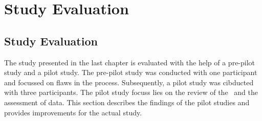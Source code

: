 \chapter{Study Evaluation}
\label{chapter:study_evaluation}
\section{Study Evaluation}
\label{sec:study_evaluation}
The study presented in the last chapter is evaluated with the help of a pre-pilot study and a pilot study. The pre-pilot study was conducted with one participant and focussed on flaws in the process. Subsequently, a pilot study was cibducted with three participants. The pilot study focuss lies on the review of the \exgo\ and the assessment of data. This section describes the findings of the pilot studies and provides improvements for the actual study.

